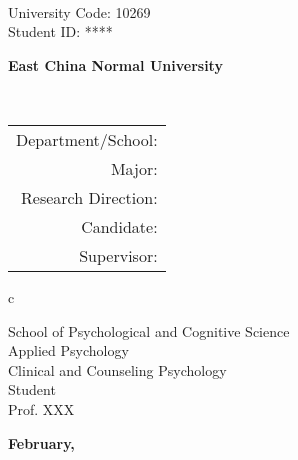 
\pagestyle{empty}

\\
\hspace*{\fill} {\large University Code: 10269}\\
\hspace*{\fill} {\large Student ID: \ifnotanonymous {\stuID} \else *****\fi}

\vskip 3cm

\begin{center}
    {\large \bf East China Normal University}
\end{center}

\vskip 1cm

\begin{center}
    \bfseries{\scshape{\yihao {\thesisETitle}}} \\
\end{center}

\vskip 2cm

{\large
\begin{center}
\begin{tabular}{r}
    Department/School:         \\
    Major:              \\
    Research Direction: \\
    Candidate:    \\
    Supervisor:         \\
\end{tabular}
\begin{tabular}c

    School of Psychological and Cognitive Science \\
    \hline Applied Psychology \\
    \hline Clinical and Counseling Psychology  \\
    \hline Student \\
    \hline Prof. XXX  \\

    \hline
\end{tabular}
\end{center}
}


\vskip 3cm 

\begin{center}
    {\Large \textbf{February, \year}}
\end{center}
